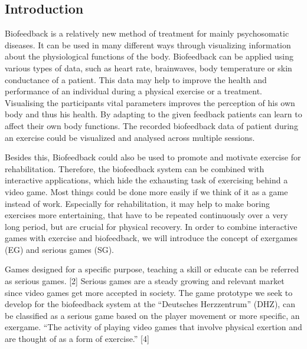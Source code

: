\begin{multicols}{2}

\section{Introduction}

Biofeedback is a relatively new method of treatment for mainly psychosomatic diseases. It can be used in many different ways through visualizing information about the physiological functions of the body. Biofeedback can be applied using various types of data, such as heart rate, brainwaves, body temperature or skin conductance of a patient. This data may help to improve the health and performance of an individual during a physical exercise or a treatment. Visualising the participants vital parameters improves the perception of his own body and thus his health. By adapting to the given feedback patients can learn to affect their own body functions.\cite{Goe2010} The recorded biofeedback data of patient during an exercise could be visualized and analysed across multiple sessions. 

Besides this, Biofeedback could also be used to promote and motivate exercise for rehabilitation. Therefore, the biofeedback system can be combined with interactive applications, which hide the exhausting task of exercising behind a video game. Most things could be done more easily if we think of it as a game instead of work. Especially for rehabilitation, it may help to make boring exercises more entertaining, that have to be repeated continuously over a very long period, but are crucial for physical recovery. In order to combine interactive games with
exercise and biofeedback, we will introduce the concept of exergames (EG) and serious games (SG).

Games designed for a specific purpose, teaching a skill or educate can be referred as serious games. [2] Serious games are a steady growing and relevant market since video games get more accepted in society. \cite{BF2007} The game prototype we seek to develop for the biofeedback system at the “Deutsches Herzzentrum” (DHZ), can be classified as a serious game based on the player movement or more specific, an exergame. “The activity of playing video games that involve physical exertion and are thought of as a form of exercise.” [4]


\end{multicols}
